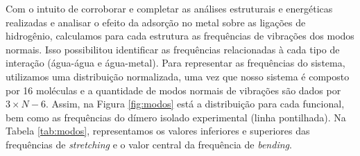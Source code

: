 Com o intuito de corroborar e completar as análises estruturais e energéticas realizadas e analisar o efeito da adsorção no metal sobre as ligações de hidrogênio, calculamos para cada estrutura as frequências de vibrações dos modos normais. Isso possibilitou identificar as frequências relacionadas à cada tipo de interação (água-água e água-metal). Para representar as frequências do sistema, utilizamos uma distribuição normalizada, uma vez que nosso sistema é composto por 16 moléculas e a quantidade de modos normais de vibrações são dados por $ 3\times N-6 $. Assim, na Figura \ref{fig:modos} está a distribuição para cada funcional, bem como as frequências do dímero isolado experimental (linha pontilhada). Na Tabela \ref{tab:modos}, representamos os valores inferiores e superiores das frequências de \textit{stretching} e o valor central da frequência de \textit{bending}.

